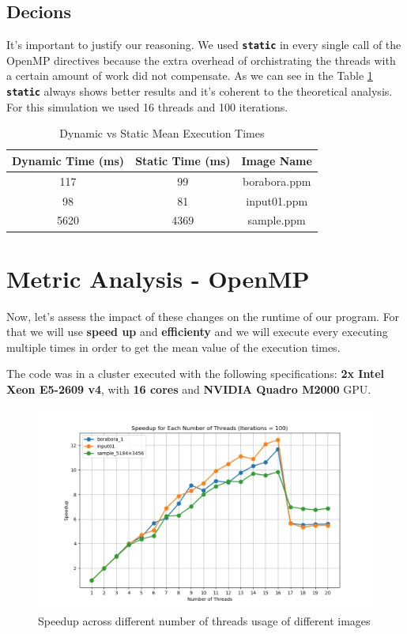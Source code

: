 \documentclass[sigconf]{acmart}
\begin{document}
\subsection{Decions}
It's important to justify our reasoning. We used \texttt{\textbf{static}} in every single call of the OpenMP directives because the extra overhead of orchistrating the threads with a certain amount of work did not compensate. As we can see in the Table \ref{table:staticanddynamic} \texttt{\textbf{static}} always shows better results and it's coherent to the theoretical analysis. For this simulation we used 16 threads and 100 iterations.

\begin{table}[h!]
\centering
\begin{tabular}{|c|c|c|}
\hline
\textbf{Dynamic Time (ms)} & \textbf{Static Time (ms)} & \textbf{Image Name} \\
\hline
117 & 99& borabora.ppm \\
\hline
98 & 81 & input01.ppm \\
\hline
5620 & 4369 & sample.ppm \\
\hline
\end{tabular}
\vspace{0.2cm} %
\caption{Dynamic vs Static Mean Execution Times}
\label{table:staticanddynamic}
\end{table}

\section{Metric Analysis - OpenMP}
Now, let's assess the impact of these changes on the runtime of our program. For that we will use \textbf{speed up} and \textbf{efficienty} and we will execute every executing multiple times in order to get the mean value of the execution times.

The code was in a cluster executed with the following specifications: \textbf{2x Intel Xeon E5-2609 v4}, with \textbf{16 cores} and \textbf{NVIDIA Quadro M2000} GPU.

\begin{figure}[h]
  \centering
  \includegraphics[width=\linewidth]{images/openMP.png}
  \caption{Speedup across different number of threads usage of different images}
 \label{fig1}
\end{figure}
\end{document}
